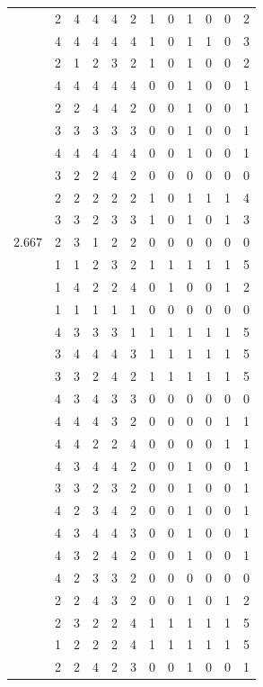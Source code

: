 \documentclass[]{book}
\theoremstyle{definition}
\theoremstyle{definition}
\theoremstyle{definition}
\theoremstyle{remark}
\begin{document}
\begin{table}
{\begin{tabular}[t]{rrrrrrrrrrrr}
 & 2 & 4 & 4 & 4 & 2 & 1 & 0 & 1 & 0 & 0 & 2\\
 & 4 & 4 & 4 & 4 & 4 & 1 & 0 & 1 & 1 & 0 & 3\\
 & 2 & 1 & 2 & 3 & 2 & 1 & 0 & 1 & 0 & 0 & 2\\
 & 4 & 4 & 4 & 4 & 4 & 0 & 0 & 1 & 0 & 0 & 1\\
 & 2 & 2 & 4 & 4 & 2 & 0 & 0 & 1 & 0 & 0 & 1\\
 & 3 & 3 & 3 & 3 & 3 & 0 & 0 & 1 & 0 & 0 & 1\\
 & 4 & 4 & 4 & 4 & 4 & 0 & 0 & 1 & 0 & 0 & 1\\
 & 3 & 2 & 2 & 4 & 2 & 0 & 0 & 0 & 0 & 0 & 0\\
 & 2 & 2 & 2 & 2 & 2 & 1 & 0 & 1 & 1 & 1 & 4\\
 & 3 & 3 & 2 & 3 & 3 & 1 & 0 & 1 & 0 & 1 & 3\\
2.667 & 2 & 3 & 1 & 2 & 2 & 0 & 0 & 0 & 0 & 0 & 0\\
 & 1 & 1 & 2 & 3 & 2 & 1 & 1 & 1 & 1 & 1 & 5\\
 & 1 & 4 & 2 & 2 & 4 & 0 & 1 & 0 & 0 & 1 & 2\\
 & 1 & 1 & 1 & 1 & 1 & 0 & 0 & 0 & 0 & 0 & 0\\
 & 4 & 3 & 3 & 3 & 1 & 1 & 1 & 1 & 1 & 1 & 5\\
 & 3 & 4 & 4 & 4 & 3 & 1 & 1 & 1 & 1 & 1 & 5\\
 & 3 & 3 & 2 & 4 & 2 & 1 & 1 & 1 & 1 & 1 & 5\\
 & 4 & 3 & 4 & 3 & 3 & 0 & 0 & 0 & 0 & 0 & 0\\
 & 4 & 4 & 4 & 3 & 2 & 0 & 0 & 0 & 0 & 1 & 1\\
 & 4 & 4 & 2 & 2 & 4 & 0 & 0 & 0 & 0 & 1 & 1\\
 & 4 & 3 & 4 & 4 & 2 & 0 & 0 & 1 & 0 & 0 & 1\\
 & 3 & 3 & 2 & 3 & 2 & 0 & 0 & 1 & 0 & 0 & 1\\
 & 4 & 2 & 3 & 4 & 2 & 0 & 0 & 1 & 0 & 0 & 1\\
 & 4 & 3 & 4 & 4 & 3 & 0 & 0 & 1 & 0 & 0 & 1\\
 & 4 & 3 & 2 & 4 & 2 & 0 & 0 & 1 & 0 & 0 & 1\\
 & 4 & 2 & 3 & 3 & 2 & 0 & 0 & 0 & 0 & 0 & 0\\
 & 2 & 2 & 4 & 3 & 2 & 0 & 0 & 1 & 0 & 1 & 2\\
 & 2 & 3 & 2 & 2 & 4 & 1 & 1 & 1 & 1 & 1 & 5\\
 & 1 & 2 & 2 & 2 & 4 & 1 & 1 & 1 & 1 & 1 & 5\\
 & 2 & 2 & 4 & 2 & 3 & 0 & 0 & 1 & 0 & 0 & 1\\

\end{tabular}}
\end{table}
\end{document}
